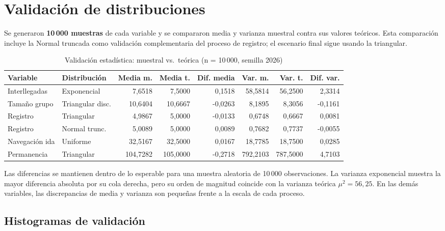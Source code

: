 \documentclass[12pt,a4paper]{article}
\begin{document}
\section{Validación de distribuciones}

Se generaron \textbf{10\,000 muestras} de cada variable y se compararon
media y varianza muestral contra sus valores teóricos. Esta comparación
incluye la Normal truncada como validación complementaria del proceso de
registro; el escenario final sigue usando la triangular.

\begin{table}[H]
  \centering
  \caption{Validación estadística: muestral vs.\ teórica (n = 10\,000, semilla 2026)}
  \scriptsize
  \begin{tabular}{@{}llrrrrrr@{}}
    \toprule
    Variable & Distribución & Media m. & Media t. & Dif. media & Var. m. & Var. t. & Dif. var. \\
    \midrule
    Interllegadas & Exponencial & 7,6518 & 7,5000 & 0,1518 & 58,5814 & 56,2500 & 2,3314 \\
    Tamaño grupo & Triangular disc. & 10,6404 & 10,6667 & -0,0263 & 8,1895 & 8,3056 & -0,1161 \\
    Registro & Triangular & 4,9867 & 5,0000 & -0,0133 & 0,6748 & 0,6667 & 0,0081 \\
    Registro & Normal trunc. & 5,0089 & 5,0000 & 0,0089 & 0,7682 & 0,7737 & -0,0055 \\
    Navegación ida & Uniforme & 32,5167 & 32,5000 & 0,0167 & 18,7785 & 18,7500 & 0,0285 \\
    Permanencia & Triangular & 104,7282 & 105,0000 & -0,2718 & 792,2103 & 787,5000 & 4,7103 \\
    \bottomrule
  \end{tabular}
\end{table}

\noindent Las diferencias se mantienen dentro de lo esperable para una
muestra aleatoria de 10\,000 observaciones. La varianza exponencial muestra
la mayor diferencia absoluta por su cola derecha, pero su orden de magnitud
coincide con la varianza teórica $\mu^2 = 56{,}25$. En las demás variables,
las discrepancias de media y varianza son pequeñas frente a la escala de
cada proceso.

\subsection{Histogramas de validación}
\end{document}

